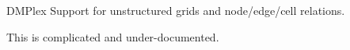 \begin{numberedframe}{DMPlex}
  Support for unstructured grids and node/edge/cell relations.

  This is complicated and under-documented.
\end{numberedframe}

\endinput







